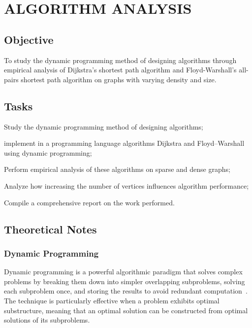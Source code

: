 \documentclass[12pt, a4paper]{report}
\begin{document}
\chapter{ALGORITHM ANALYSIS}

\section{Objective}

To study the dynamic programming method of designing algorithms through empirical analysis of Dijkstra's shortest path algorithm and Floyd-Warshall's all-pairs shortest path algorithm on graphs with varying density and size.

\section{Tasks}

\begin{dashenum}
  \item Study the dynamic programming method of designing algorithms;
  \item implement in a programming language algorithms Dijkstra and Floyd–Warshall using dynamic programming;
  \item Perform empirical analysis of these algorithms on sparse and dense graphs;
  \item Analyze how increasing the number of vertices influences algorithm performance;
  \item Compile a comprehensive report on the work performed.
\end{dashenum}

\section{Theoretical Notes}

\subsection{Dynamic Programming}

Dynamic programming is a powerful algorithmic paradigm that solves complex problems by breaking them down into simpler overlapping subproblems, solving each subproblem once, and storing the results to avoid redundant computation~\cite{ref:dp}. The technique is particularly effective when a problem exhibits optimal substructure, meaning that an optimal solution can be constructed from optimal solutions of its subproblems.
\end{document}
